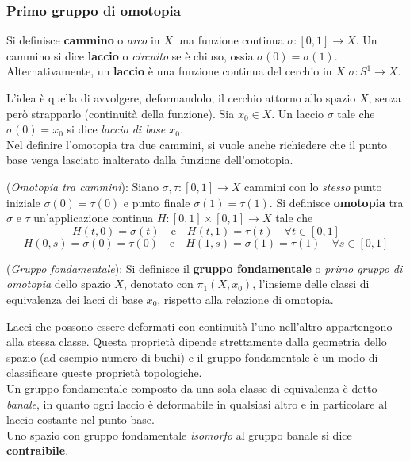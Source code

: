 \subsubsection{Primo gruppo di omotopia}
\begin{definition}
   Si definisce \textbf{cammino} o \emph{arco} in $X$ una funzione continua
   $\sigma : [0,1] \to X$. Un cammino si dice \textbf{laccio} o \emph{circuito}
   se è chiuso, ossia $\sigma(0) = \sigma(1)$.\\
   Alternativamente, un \textbf{laccio} è una funzione continua del cerchio in $X$
   $\sigma : S^1 \to X$.
\end{definition}
L'idea è quella di avvolgere, deformandolo, il cerchio attorno allo spazio $X$,
senza però strapparlo (continuità della funzione).
Sia $x_0 \in X$. Un laccio $\sigma$ tale che $\sigma(0) = x_0$ si dice
\emph{laccio di base $x_0$}.\\

Nel definire l'omotopia tra due cammini, si vuole anche richiedere che il
punto base venga lasciato inalterato dalla funzione dell'omotopia.

\begin{definition}(\emph{Omotopia tra cammini}):
   Siano $\sigma,\tau : [0,1] \to X$ cammini con lo \emph{stesso} punto iniziale
   $\sigma(0) = \tau(0)$ e punto finale $\sigma(1) = \tau(1)$.
   Si definisce \textbf{omotopia} tra $\sigma$ e $\tau$ un'applicazione continua
   $H : [0,1] \times [0,1] \to X$ tale che
      $$ H(t,0) = \sigma(t) \quad \mathrm{e} \quad H(t,1) = \tau(t)
         \quad \forall t \in [0,1]$$
      $$ H(0,s) = \sigma(0) = \tau(0) \quad \mathrm{e} \quad
         H(1,s) = \sigma(1) = \tau(1) \quad \forall s \in [0,1] $$
\end{definition}

\begin{definition}(\emph{Gruppo fondamentale}):
   Si definisce il \textbf{gruppo fondamentale} o \emph{primo gruppo di omotopia}
   dello spazio $X$, denotato con $\pi_1(X,x_0)$, l'insieme delle classi di
   equivalenza dei lacci di base $x_0$, rispetto alla relazione di omotopia.
\end{definition}

Lacci che possono essere deformati con continuità l'uno nell'altro appartengono
alla stessa classe. Questa proprietà dipende strettamente dalla geometria dello
spazio (ad esempio numero di buchi) e il gruppo fondamentale è un modo di classificare
queste proprietà topologiche.\\
Un gruppo fondamentale composto da una sola classe di equivalenza è detto \emph{banale},
in quanto ogni laccio è deformabile in qualsiasi altro e in particolare al laccio
costante nel punto base.\\
Uno spazio con gruppo fondamentale \emph{isomorfo} al gruppo banale si dice
\textbf{contraibile}. \\

